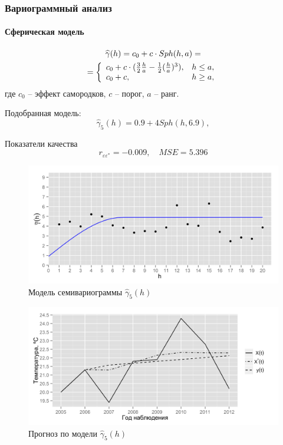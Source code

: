 \documentclass{beamer}
\begin{document}
\begin{frame}
  \frametitle{Вариограммный анализ}
  \framesubtitle{Сферическая модель}
  \begin{multicols}{2}
  \begin{equation}\begin{gathered}
  \label{eq:sph}
    \widehat{\gamma}(h) = c_0 + c \cdot Sph(h, a) = \\
    = \left\{
    \begin{array}{l l}
      c_0 + c \cdot (\frac{3}{2} \frac{h}{a} - \frac{1}{2}(\frac{h}{a})^3), & h \le a, \\
      c_0 + c, & h \geq a,
    \end{array} \right.
  \end{gathered}\end{equation}
  где $ c_0 $ -- эффект самородков, $ c $ -- порог, $ a $ -- ранг.

  \medskip

  Подобранная модель:
  \begin{equation}
  \label{eq:gamma5}
    \widehat{\gamma}_5(h) = 0.9 + 4 Sph(h, 6.9),
  \end{equation}

  Показатели качества
  \begin{equation*}
    r_{\varepsilon\varepsilon^{*}} = -0.009, \quad MSE = 5.396
  \end{equation*}
  
  \columnbreak

  \vspace{-14.5pt}
  \begin{figure}[H]
    \includegraphics[width=0.9\linewidth]{../../figures/variogram/sph-fit-adapt-modeled.png} \\
    \caption{Модель семивариограммы $\widehat{\gamma}_5(h)$}
    \includegraphics[width=0.9\linewidth]{../../figures/variogram/sph-fit-adapt-cross-prediction.png}
    \caption{Прогноз по модели $\widehat{\gamma}_5(h)$}
  \end{figure}
  \end{multicols}
\end{frame}
\end{document}
